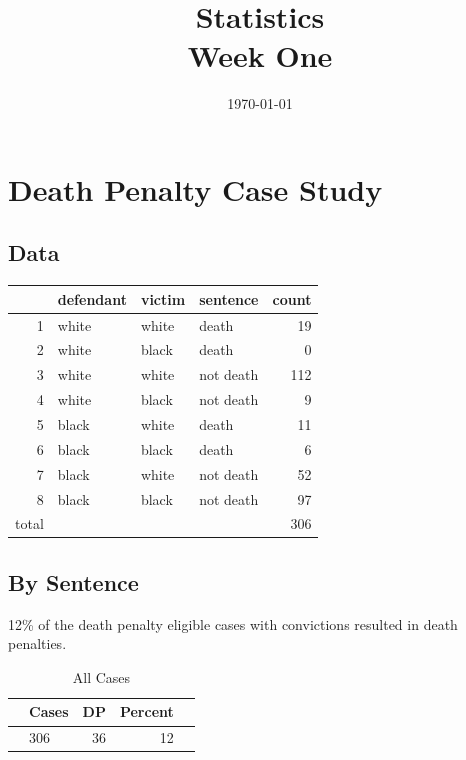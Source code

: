\documentclass[letterpaper, landscape]{article}
\author{}
\date{\today}
\title{Statistics \\ Week One}
\begin{document}
  \maketitle

  \section{Death Penalty Case Study}
  
  \subsection{Data}
  \begin{table}[ht]
  \centering
  \begin{tabular}{rlllr}
    \toprule
          & defendant & victim & sentence  & count \\
    \midrule
    1     & white & white & death     & 19 \\
    2     & white & black & death     & 0 \\
    3     & white & white & not death & 112 \\
    4     & white & black & not death & 9 \\
    5     & black & white & death     & 11 \\
    6     & black & black & death     & 6 \\
    7     & black & white & not death & 52 \\
    8     & black & black & not death & 97 \\
    \midrule
    total &       &       &           & 306 \\
    \bottomrule
  \end{tabular}
  \end{table}

  \subsection{By Sentence}

  12\% of the death penalty eligible cases with convictions resulted in death penalties.

  \begin{table}[H]
    \centering
    \begin{tabular}{rlrrr}
      \toprule
      & Cases & DP & Percent \\
      \midrule
      & 306   & 36 & 12 \\
     \bottomrule
    \end{tabular}
    \caption{All Cases}
  \end{table}
\end{document}
